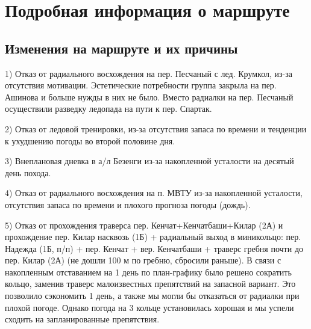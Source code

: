 \section{Подробная информация о маршруте}\label{sec:route}
	\subsection{Изменения на маршруте и их причины}\label{subsec:changes_of_way}
1) Отказ от радиального восхождения на пер. Песчаный с лед. Крумкол, из-за отсутствия мотивации. Эстетические потребности группа закрыла на пер. Ашинова и больше нужды в них не было. Вместо радиалки на пер. Песчаный осуществили разведку ледопада на пути к пер. Спартак.

2) Отказ от ледовой тренировки, из-за отсутствия запаса по времени и тенденции к ухудшению погоды во второй половине дня.

3) Внеплановая дневка в а/л Безенги из-за накопленной усталости на десятый день похода.

4) Отказ от радиального восхождения на п. МВТУ из-за накопленной усталости, отсутствия запаса по времени и плохого прогноза погоды (дождь).

5) Отказ от прохождения траверса пер. Кенчат+Кенчатбаши+Килар (2А) и прохождение пер. Килар насквозь (1Б) + радиальный выход в миникольцо: пер. Надежда (1Б, п/п) + пер. Кенчат + вер. Кенчатбаши + траверс гребня почти до пер. Килар (2А) (не дошли 100 м по гребню, сбросили раньше). В связи с накопленным отставанием на 1 день по план-графику было решено сократить кольцо, заменив траверс малоизвестных препятствий на запасной вариант. Это позволило сэкономить 1 день, а также мы могли бы отказаться от радиалки при плохой погоде. Однако погода на 3 кольце установилась хорошая и мы успели сходить на запланированные препятствия.

	
